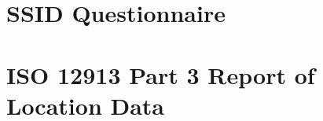 \documentclass[twoside,fontsize=12pt,titlepage,chapterprefix=true
]{scrbook}
\begin{document}
\mainmatter











% 






 






 




 \backmatter
 \printglossaries

 


\begin{appendices}

 \chapter{SSID Questionnaire}\label{app:questionnaire}
 

 \chapter{ISO 12913 Part 3 Report of Location Data}\label{app:location-data}
      

 

 

\end{appendices}

\end{document}
